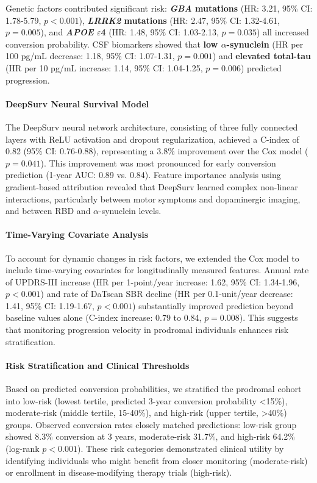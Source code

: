 Genetic factors contributed significant risk: \textbf{\textit{GBA} mutations} (HR: 3.21, 95\% CI: 1.78-5.79, $p < 0.001$), \textbf{\textit{LRRK2} mutations} (HR: 2.47, 95\% CI: 1.32-4.61, $p = 0.005$), and \textbf{\textit{APOE} $\varepsilon$4} (HR: 1.48, 95\% CI: 1.03-2.13, $p = 0.035$) all increased conversion probability. CSF biomarkers showed that \textbf{low $\alpha$-synuclein} (HR per 100 pg/mL decrease: 1.18, 95\% CI: 1.07-1.31, $p = 0.001$) and \textbf{elevated total-tau} (HR per 10 pg/mL increase: 1.14, 95\% CI: 1.04-1.25, $p = 0.006$) predicted progression.

\paragraph{DeepSurv Neural Survival Model}
The DeepSurv neural network architecture, consisting of three fully connected layers with ReLU activation and dropout regularization, achieved a C-index of 0.82 (95\% CI: 0.76-0.88), representing a 3.8\% improvement over the Cox model ($p = 0.041$). This improvement was most pronounced for early conversion prediction (1-year AUC: 0.89 vs. 0.84). Feature importance analysis using gradient-based attribution revealed that DeepSurv learned complex non-linear interactions, particularly between motor symptoms and dopaminergic imaging, and between RBD and $\alpha$-synuclein levels.

\paragraph{Time-Varying Covariate Analysis}
To account for dynamic changes in risk factors, we extended the Cox model to include time-varying covariates for longitudinally measured features. Annual rate of UPDRS-III increase (HR per 1-point/year increase: 1.62, 95\% CI: 1.34-1.96, $p < 0.001$) and rate of DaTscan SBR decline (HR per 0.1-unit/year decrease: 1.41, 95\% CI: 1.19-1.67, $p < 0.001$) substantially improved prediction beyond baseline values alone (C-index increase: 0.79 to 0.84, $p = 0.008$). This suggests that monitoring progression velocity in prodromal individuals enhances risk stratification.

\paragraph{Risk Stratification and Clinical Thresholds}
Based on predicted conversion probabilities, we stratified the prodromal cohort into low-risk (lowest tertile, predicted 3-year conversion probability <15\%), moderate-risk (middle tertile, 15-40\%), and high-risk (upper tertile, >40\%) groups. Observed conversion rates closely matched predictions: low-risk group showed 8.3\% conversion at 3 years, moderate-risk 31.7\%, and high-risk 64.2\% (log-rank $p < 0.001$). These risk categories demonstrated clinical utility by identifying individuals who might benefit from closer monitoring (moderate-risk) or enrollment in disease-modifying therapy trials (high-risk).

